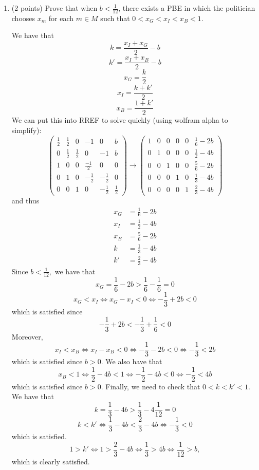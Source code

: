 \documentclass[11pt]{article}
\begin{document}
\begin{enumerate}
        \item (2 points) Prove that when $b < \frac{1}{12}$, there exists a PBE in which the politician chooses $x_m$ for each $m \in M$ such that $0 < x_G < x_I < x_B < 1$.
    \begin{solution}
We have that 
\[k = \frac{x_I + x_G}{2} - b\]
\[k' = \frac{x_I + x_B}{2} - b\]
\[x_G = \frac{k}{2}\]
\[x_I = \frac{k + k'}{2}\]
\[x_B = \frac{1 + k'}{2}\]
We can put this into RREF to solve quickly (using wolfram alpha to simplify):
\[\left(\begin{array}{ccccc|c}
    \frac{1}{2} & \frac{1}{2} & 0 & -1 & 0 &b\\
    0 & \frac{1}{2} & \frac{1}{2} & 0 & -1 & b\\
    1 & 0 & 0 & \frac{-1}{2} & 0 & 0\\
    0 & 1 & 0 & -\frac{1}{2} & -\frac{1}{2} & 0\\
    0 & 0 & 1 & 0 & -\frac{1}{2} & \frac{1}{2}
\end{array}\right) \to \left(\begin{array}{ccccc|c}
1 & 0 & 0 & 0 & 0 & \frac{1}{6} - 2b \\
0 & 1 & 0 & 0 & 0 & \frac{1}{2} - 4b \\
0 & 0 & 1 & 0 & 0 & \frac{5}{6} - 2b \\
0 & 0 & 0 & 1 & 0 & \frac{1}{3} - 4b \\
0 & 0 & 0 & 0 & 1 & \frac{2}{3} - 4b
\end{array}\right)\] and thus 
\begin{align}
    x_G &= \frac{1}{6} - 2b\\
    x_I &= \frac{1}{2} - 4b\\
    x_B &= \frac{5}{6} - 2b\\
    k &= \frac{1}{3} - 4b\\
    k' &= \frac{2}{3} - 4b
\end{align}
Since $b < \frac{1}{12},$ we have that 
\[x_G = \frac{1}{6} - 2b > \frac{1}{6} - \frac{1}{6} = 0\]
\[x_G < x_I \iff x_G - x_I < 0 \iff -\frac{1}{3} + 2b < 0\] which is satisfied since 
\[-\frac{1}{3} + 2b < -\frac{1}{3} + \frac{1}{6} < 0\]
Moreover, 
\[x_I < x_B \iff x_I - x_B < 0 \iff -\frac{1}{3} - 2b <0 \iff -\frac{1}{3} < 2b\] which is satisfied since $b>0.$ We also have that 
\[x_B < 1 \iff \frac{1}{2} - 4b <1 \iff -\frac{1}{2} -4b <0 \iff -\frac{1}{2} < 4b \] which is satisfied since $b>0.$ Finally, we need to check that $0  < k < k' < 1.$ We have that 
\[k = \frac{1}{3} - 4b >\frac{1}{3} - 4\frac{1}{12} = 0\]
\[k < k' \iff \frac{1}{3} - 4b < \frac{2}{3} - 4b \iff -\frac{1}{3} <0\] which is satisfied.
\[1 > k'  \iff 1>\frac{2}{3} - 4b \iff \frac{1}{3} > 4b \iff \frac{1}{12} >b,\] which is clearly satisfied. 


\end{solution}
\end{enumerate}
\end{document}
